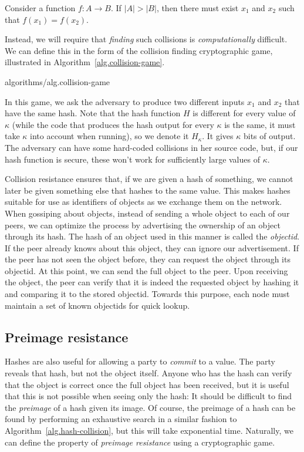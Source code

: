 \begin{theorem}[Pigeonhole]
  Consider a function $f: A \longrightarrow B$. If $|A| > |B|$, then there must
  exist $x_1$ and $x_2$ such that $f(x_1) = f(x_2)$.
\end{theorem}

Instead, we will require that \emph{finding} such collisions is \emph{computationally}
difficult. We can define this in the form of the collision finding cryptographic game,
illustrated in Algorithm~\ref{alg.collision-game}.

{algorithms/alg.collision-game}

In this game, we ask the adversary to produce two different inputs $x_1$ and $x_2$
that have the same hash. Note that the hash function $H$ is different
for every value of $\kappa$ (while the code that produces the hash output for every
$\kappa$ is the same, it must take $\kappa$ into account when running), so we
denote it $H_\kappa$. It gives $\kappa$ bits of output. The adversary can have some
hard-coded collisions in her source code, but, if our hash function is secure, these won't work for
sufficiently large values of $\kappa$.

Collision resistance ensures that, if we are given a hash of something, we cannot
later be given something else that hashes to the same value. This makes hashes suitable
for use as identifiers of objects as we exchange them on the network. When gossiping
about objects, instead of sending a whole object to each of our peers, we can optimize
the process by advertising the ownership of an object through its hash. The hash of
an object used in this manner is called the \emph{objectid}. If the peer already knows
about this object, they can ignore our advertisement. If the peer has not seen the
object before, they can request the object through its objectid. At this point, we can
send the full object to the peer. Upon receiving the object, the peer can verify that
it is indeed the requested object by hashing it and comparing it to the stored objectid.
Towards this purpose, each node must maintain a set of known objectids for quick lookup.

\subsection*{Preimage resistance}

Hashes are also useful for allowing a party to \emph{commit} to a value. The party
reveals that hash, but not the object itself. Anyone who has the hash can verify that
the object is correct once the full object has been received, but it is useful that
this is not possible when seeing only the hash: It should be difficult to find the
\emph{preimage} of a hash given its image. Of course, the preimage of a hash can
be found by performing an exhaustive search in a similar fashion to
Algorithm~\ref{alg.hash-collision}, but this will take exponential time.
Naturally, we can define the property of \emph{preimage resistance} using a
cryptographic game.

